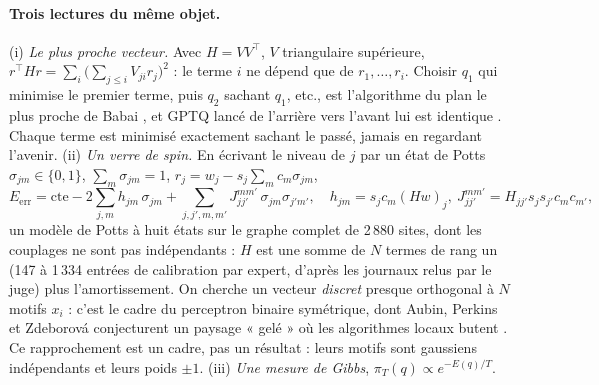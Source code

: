 \paragraph{Trois lectures du même objet.} (i) \emph{Le plus proche vecteur.} Avec $H = VV^\top$, $V$ triangulaire supérieure, $r^\top H r = \sum_i \bigl(\sum_{j \le i} V_{ji} r_j\bigr)^2$ : le terme $i$ ne dépend que de $r_1, \dots, r_i$. Choisir $q_1$ qui minimise le premier terme, puis $q_2$ sachant $q_1$, etc., est l'algorithme du plan le plus proche de Babai \cite{babai1986}, et GPTQ lancé de l'arrière vers l'avant lui est identique \cite{chen2025babai,frantar2022gptq}. Chaque terme est minimisé exactement sachant le passé, jamais en regardant l'avenir. (ii) \emph{Un verre de spin.} En écrivant le niveau de $j$ par un état de Potts $\sigma_{jm} \in \{0,1\}$, $\sum_m \sigma_{jm} = 1$, $r_j = w_j - s_j \sum_m c_m \sigma_{jm}$,
\begin{equation}\label{t3mim:eq:potts}
E_{\text{err}} = \text{cte} - 2\sum_{j,m} h_{jm}\,\sigma_{jm} + \sum_{j,j',m,m'} J^{mm'}_{jj'}\,\sigma_{jm}\sigma_{j'm'}, \quad h_{jm} = s_j c_m (Hw)_j,\ J^{mm'}_{jj'} = H_{jj'} s_j s_{j'} c_m c_{m'} ,
\end{equation}
un modèle de Potts à huit états sur le graphe complet de 2\,880 sites, dont les couplages ne sont pas indépendants : $H$ est une somme de $N$ termes de rang un (147 à 1\,334 entrées de calibration par expert, d'après les journaux relus par le juge) plus l'amortissement. On cherche un vecteur \emph{discret} presque orthogonal à $N$ motifs $x_i$ : c'est le cadre du perceptron binaire symétrique, dont Aubin, Perkins et Zdeborová conjecturent un paysage « gelé » où les algorithmes locaux butent \cite{aubin2019perceptrons}. Ce rapprochement est un cadre, pas un résultat : leurs motifs sont gaussiens indépendants et leurs poids $\pm 1$. (iii) \emph{Une mesure de Gibbs}, $\pi_T(q) \propto e^{-E(q)/T}$.

